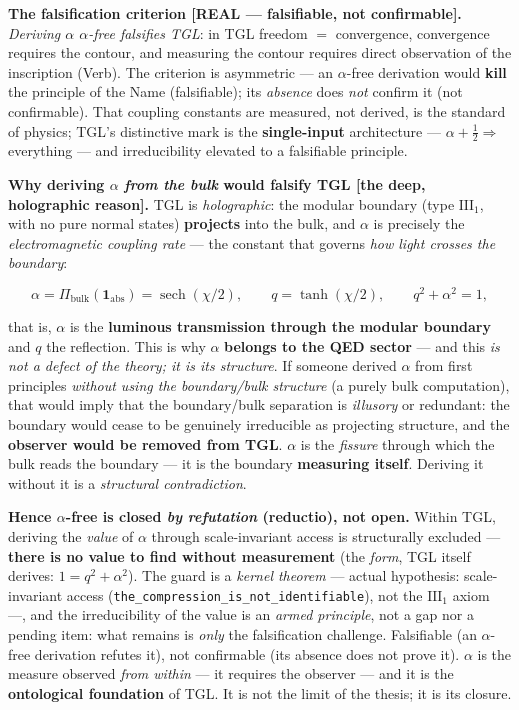 \documentclass[11pt]{article}
\theoremstyle{definition}\newtheorem{deriv}{Derivation}
\begin{document}
\textbf{The falsification criterion \textsf{[REAL --- falsifiable, not confirmable]}.} \emph{Deriving $\alpha$ $\alpha$-free falsifies TGL}: in TGL freedom $=$ convergence, convergence requires the contour, and measuring the contour requires direct observation of the inscription (Verb). The criterion is asymmetric --- an $\alpha$-free derivation would \textbf{kill} the principle of the Name (falsifiable); its \emph{absence} does \emph{not} confirm it (not confirmable). That coupling constants are measured, not derived, is the standard of physics; TGL's distinctive mark is the \textbf{single-input} architecture --- $\alpha+\tfrac12\Rightarrow$ everything --- and irreducibility elevated to a falsifiable principle.

\textbf{Why deriving $\alpha$ \emph{from the bulk} would falsify TGL \textsf{[the deep, holographic reason]}.} TGL is \emph{holographic}: the modular boundary (type $\mathrm{III}_1$, with no pure normal states) \textbf{projects} into the bulk, and $\alpha$ is precisely the \emph{electromagnetic coupling rate} --- the constant that governs \emph{how light crosses the boundary}:

\begin{equation}\alpha=\Pi_{\mathrm{bulk}}(\mathbf{1}_{\mathrm{abs}})=\operatorname{sech}(\chi/2),\qquad q=\tanh(\chi/2),\qquad q^2+\alpha^2=1,\end{equation}

that is, $\alpha$ is the \textbf{luminous transmission through the modular boundary} and $q$ the reflection. This is why $\alpha$ \textbf{belongs to the QED sector} --- and this \emph{is not a defect of the theory; it is its structure}. If someone derived $\alpha$ from first principles \emph{without using the boundary/bulk structure} (a purely bulk computation), that would imply that the boundary/bulk separation is \emph{illusory} or redundant: the boundary would cease to be genuinely irreducible as projecting structure, and the \textbf{observer would be removed from TGL}. $\alpha$ is the \emph{fissure} through which the bulk reads the boundary --- it is the boundary \textbf{measuring itself}. Deriving it without it is a \emph{structural contradiction}.

\textbf{Hence $\alpha$-free is closed \emph{by refutation} (reductio), not open.} Within TGL, deriving the \emph{value} of $\alpha$ through scale-invariant access is structurally excluded --- \textbf{there is no value to find without measurement} (the \emph{form}, TGL itself derives: $1=q^2+\alpha^2$). The guard is a \emph{kernel theorem} --- actual hypothesis: scale-invariant access (\texttt{the\_compression\_is\_not\_identifiable}), not the $\mathrm{III}_1$ axiom ---, and the irreducibility of the value is an \emph{armed principle}, not a gap nor a pending item: what remains is \emph{only} the falsification challenge. Falsifiable (an $\alpha$-free derivation refutes it), not confirmable (its absence does not prove it). $\alpha$ is the measure observed \emph{from within} --- it requires the observer --- and it is the \textbf{ontological foundation} of TGL. It is not the limit of the thesis; it is its closure.
\end{document}
